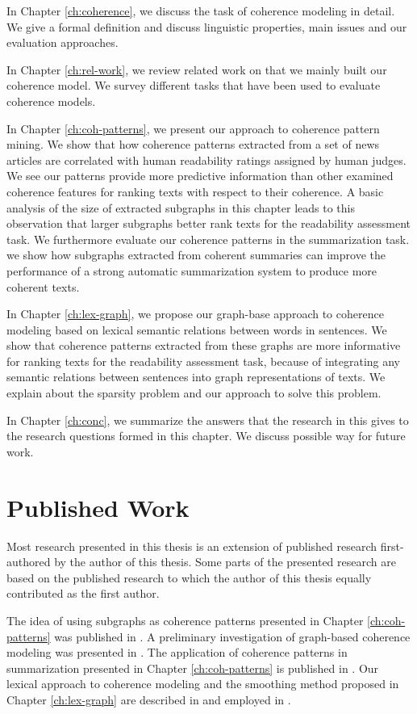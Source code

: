 In Chapter \ref{ch:coherence}, we discuss the task of coherence modeling in detail. 
We give a formal definition and discuss linguistic properties, main issues and our evaluation approaches. 

In Chapter \ref{ch:rel-work}, we review related work on that we mainly built our coherence model. 
We survey different tasks that have been used to evaluate coherence models. 

In Chapter \ref{ch:coh-patterns}, we present our approach to coherence pattern mining. 
We show that how coherence patterns extracted from a set of news articles are correlated with human readability ratings assigned by human judges. 
We see our patterns provide more predictive information than other examined coherence features for ranking texts with respect to their coherence. 
A basic analysis of the size of extracted subgraphs in this chapter leads to this observation that larger subgraphs better rank texts for the readability assessment task. 
We furthermore evaluate our coherence patterns in the summarization task.  
we show how subgraphs extracted from coherent summaries can improve the performance of a strong automatic summarization system to produce more coherent texts. 

In Chapter \ref{ch:lex-graph}, we propose our graph-base approach to coherence modeling based on lexical semantic relations between words in sentences. 
We show that coherence patterns extracted from these graphs are more informative for ranking texts for the readability assessment task, because of integrating any semantic relations between sentences into graph representations of texts. 
We explain about the sparsity problem and our approach to solve this problem. 

In Chapter \ref{ch:conc}, we summarize the answers that the research in this gives to the research questions formed in this chapter. 
We discuss possible way for future work. 

\section{Published Work}
\label{sec:intro-published}

Most research presented in this thesis is an extension of published research first-authored by the author of this thesis. 
Some parts of the presented research are based on the published research to which the author of this thesis equally contributed as the first author. 

The idea of using subgraphs as coherence patterns presented in Chapter \ref{ch:coh-patterns} was published in . 
A preliminary investigation of graph-based coherence modeling was presented in . 
The application of coherence patterns in summarization presented in Chapter \ref{ch:coh-patterns} is published in . 
Our lexical approach to coherence modeling and the smoothing method proposed in Chapter \ref{ch:lex-graph} are described in  and employed in . 


